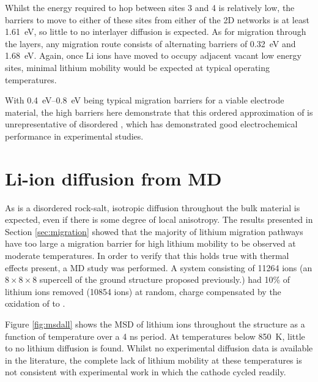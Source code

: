 Whilst the energy required to hop between sites 3 and 4 is relatively low, the barriers to move to either of these sites from either of the 2D networks is at least \SI{1.61}{\electronvolt}, so little to no interlayer diffusion is expected.
As for migration through the layers, any migration route consists of alternating barriers of \SI{0.32}{\electronvolt} and \SI{1.68}{\electronvolt}.
Again, once Li ions have moved to occupy adjacent vacant low energy sites, minimal lithium mobility would be expected at typical operating temperatures.

With \SIrange{0.4}{0.8}{\electronvolt} being typical migration barriers for a viable electrode material, the high barriers here demonstrate that this ordered approximation of  is unrepresentative of disordered , which has demonstrated good electrochemical performance in experimental studies.\cite{Freire2016}
\newpage

\section{Li-ion diffusion from MD}

As  is a disordered rock-salt, isotropic diffusion throughout the bulk material is expected, even if there is some degree of local anisotropy.
The results presented in Section \ref{sec:migration} showed that the majority of lithium migration pathways have too large a migration barrier for high lithium mobility to be observed at moderate temperatures.
In order to verify that this holds true with thermal effects present, a MD study was performed.
A system consisting of \num[group-separator={,}]{11264} ions (an $8 \times 8 \times 8$ supercell of the ground structure proposed previously.\cite{Diaz-Lopez2017}) had 10\% of lithium ions removed (\num[group-separator={,}]{10854} ions) at random, charge compensated by the oxidation of  to .

Figure \ref{fig:msdall} shows the MSD of lithium ions throughout the structure as a function of temperature over a 4 ns period.
At temperatures below \SI{850}{\kelvin}, little to no lithium diffusion is found.
Whilst no experimental diffusion data is available in the literature, the complete lack of lithium mobility at these temperatures is not consistent with experimental work in which the cathode cycled readily.

